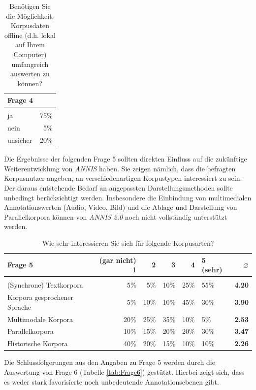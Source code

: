 	\begin{table}[H]
		\centering
		\begin{tabular}{l | r}
					Frage 4 & \\
					\hline\\
					ja 			& 75\% \\
					nein			& 5\% \\
					unsicher 		& 20\% 
		\end{tabular}
		\caption{Benötigen Sie die Möglichkeit, Korpusdaten offline (d.h. lokal auf Ihrem Computer) umfangreich auswerten zu können?}\label{tab:Frage4}
	\end{table}
	
Die Ergebnisse der folgenden Frage 5 sollten direkten Einfluss auf die zukünftige Weiterentwicklung von \emph{ANNIS} haben. Sie zeigen nämlich, dass die befragten Korpusnutzer angeben, an verschiedenartigen Korpustypen interessiert zu sein. Der daraus entstehende Bedarf an angepassten Darstellungsmethoden sollte unbedingt berücksichtigt werden. Insbesondere die Einbindung von multimedialen Annotationswerten (Audio, Video, Bild) und die Ablage und Darstellung von Parallelkorpora können von \emph{ANNIS 2.0} noch nicht vollständig unterstützt werden.

	\begin{table}[H]
		\centering
		\begin{tabular}{l | r r r r l | r}
					Frage 5 & (gar nicht) 1 & 2 & 3 & 4 & 5 (sehr) & \bf{$\varnothing$}	\\
					\hline\\
					(Synchrone) Textkorpora 			& 5\% &   5\%        & 10\%             & 25\%       & 55\% & \bf{4.20} \\
					Korpora gesprochener Sprache 	& 5\% &   10\%        & 10\%             & 45\%       & 30\% & \bf{3.90} \\
					Multimodale Korpora 			& 20\% &   25\%        & 35\%             & 10\%       & 5\% & \bf{2.53} \\
					Parallelkorpora 				& 10\% &   15\%        & 20\%             & 20\%       & 30\% & \bf{3.47} \\
					Historische Korpora 				& 40\% &   20\%        & 15\%             & 10\%       & 10\% & \bf{2.26} \\
		\end{tabular}
		\caption{Wie sehr interessieren Sie sich für folgende Korpusarten?}\label{tab:Frage5}
	\end{table}
	
Die Schlussfolgerungen aus den Angaben zu Frage 5 werden durch die Auswertung von Frage 6 (Tabelle \ref{tab:Frage6}) gestützt. Hierbei zeigt sich, dass es weder stark favorisierte noch unbedeutende Annotationsebenen gibt. 
		
